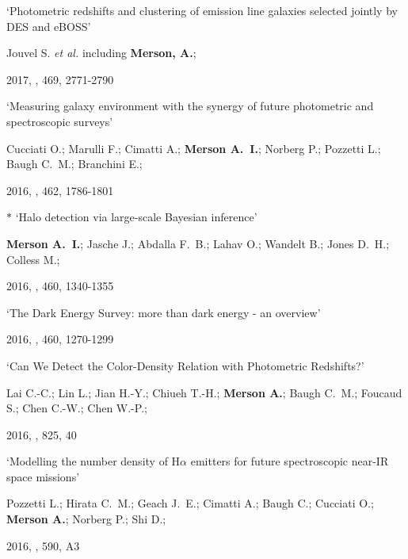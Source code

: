 \begin{etaremune}[leftmargin=15pt]
\item \label{itm:Jouvel2017} `Photometric redshifts and clustering of emission line galaxies selected jointly by DES and eBOSS'\newline
  \begin{small}Jouvel S. \textit{et al.} including \textbf{Merson, A.};\end{small} 2017, \mnras, 469, 2771-2790

\item \label{itm:Cucciati2016} `Measuring galaxy environment with the synergy of future photometric and spectroscopic surveys'\newline
  \begin{small}Cucciati O.; Marulli F.; Cimatti A.; \textbf{Merson A.~I.}; Norberg P.; Pozzetti L.; Baugh C.~M.; Branchini E.;\end{small} 2016, \mnras, 462, 1786-1801

\item \label{itm:Merson2016}{\Large $\ast$} `Halo detection via large-scale Bayesian inference'\newline
  \begin{small}\textbf{Merson A.~I.}; Jasche J.; Abdalla F.~B.; Lahav O.; Wandelt B.; Jones D.~H.; Colless M.;\end{small} 2016, \mnras, 460, 1340-1355

\item \label{itm:Dark2016} `The Dark Energy Survey: more than dark energy - an overview'\newline
  \begin{small}Dark Energy Survey Collaboration} \textit{et al.} including \textbf{Merson, A.};\end{small} 2016, \mnras, 460, 1270-1299

\item \label{itm:Lai2016} `Can We Detect the Color-Density Relation with Photometric Redshifts?'\newline
  \begin{small}Lai C.-C.; Lin L.; Jian H.-Y.; Chiueh T.-H.; \textbf{Merson A.}; Baugh C.~M.; Foucaud S.; Chen C.-W.; Chen W.-P.;\end{small} 2016, \apj, 825, 40

\item \label{itm:Pozzetti2016} `Modelling the number density of H{$\alpha$} emitters for future spectroscopic near-IR space missions'\newline
  \begin{small}Pozzetti L.; Hirata C.~M.; Geach J.~E.; Cimatti A.; Baugh C.; Cucciati O.; \textbf{Merson A.}; Norberg P.; Shi D.;\end{small} 2016, \aap, 590, A3


\end{etaremune}
